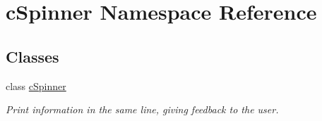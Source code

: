 \hypertarget{namespacecSpinner}{\section{c\-Spinner \-Namespace \-Reference}
\label{namespacecSpinner}
}
\subsection*{\-Classes}
\begin{DoxyCompactItemize}
\item 
class \hyperlink{classcSpinner_1_1cSpinner}{c\-Spinner}
\begin{DoxyCompactList}\small\item\em \-Print information in the same line, giving feedback to the user. \end{DoxyCompactList}\end{DoxyCompactItemize}
